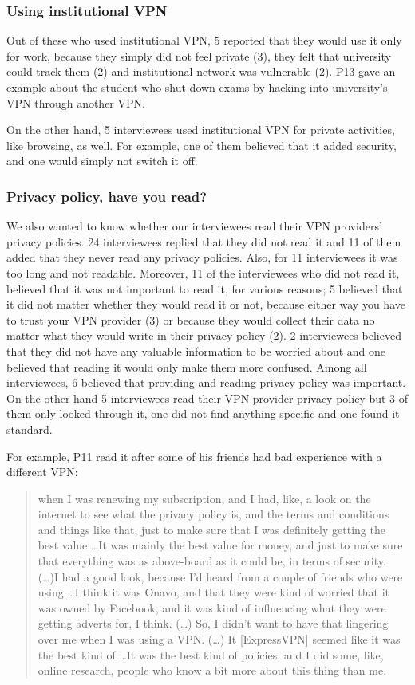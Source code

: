 \subsubsection{Using institutional VPN} 
Out of these who used institutional VPN, 5 reported that they would use it only for work, because they simply did not feel private (3), they felt that university
could track them (2) and institutional network was vulnerable  (2). P13 gave an example about the student who shut down exams by hacking into university's VPN through another VPN. %

On the other hand, 5 interviewees used institutional VPN for private activities, like browsing, as well. For example, one of them believed that it added security, and one would simply not switch it off. 

\subsubsection{Privacy policy, have you read?}
We also wanted to know whether our interviewees read their VPN providers’ privacy policies. 24 interviewees replied that they did not read it and 11 of them added that they never read any privacy policies. Also, for 11 interviewees it was too long and not readable. Moreover, 11 of the interviewees who did not read it, believed that it was not important to read it, for various reasons; 5 believed that it did not matter whether they would read it or not, because either way you have to trust your VPN provider (3) or because they would collect their data no matter what they would write in their privacy policy (2). 2 interviewees believed that they did not have any valuable information to be worried about and one believed that reading it would only make them more confused. Among all interviewees, 6 believed that providing and reading privacy policy was important. On the other hand 5 interviewees read their VPN provider privacy policy but 3 of them only looked through it, one did not find anything specific and one found it standard. 

For example, P11 read it after some of his friends had bad experience with a different VPN:
\begin{quote}when I was renewing my subscription, and I had, like, a look on the internet to see what the privacy policy is, and the terms and conditions and things like that, just to make sure that I was definitely getting the best value \dots It was mainly the best value for money, and just to make sure that everything was as above-board as it could be, in terms of security. (\dots)I had a good look, because I'd heard from a couple of friends who were using \dots I think it was Onavo, and that they were kind of worried that it was owned by Facebook, and it was kind of influencing what they were getting adverts for, I think. (\dots) So, I didn't want to have that lingering over me when I was using a VPN. (\dots) It [ExpressVPN] seemed like it was the best kind of \dots It was the best kind of policies, and I did some, like, online research, people who know a bit more about this thing than me.\end{quote}

